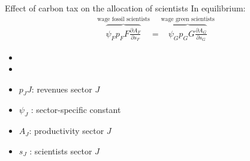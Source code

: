 \documentclass[11pt,aspectratio=169]{beamer}
\begin{document}

\begin{frame}{Effect of carbon tax on the allocation of scientists}
	\vspace{2mm}
	In equilibrium: \large
	\begin{align*}
		\overbrace{{\psi_F} p_F{F}\frac{\partial A_{F}}{\partial s_{F}}}^{\text{wage fossil scientists}}=\overbrace{{\psi_G} p_G{G}\frac{\partial A_{G}}{\partial s_{G}}}^{\text{wage green scientists}}
	\end{align*}
	\normalsize
	\begin{itemize}
		\item[] %
		\item[] %
	\end{itemize}
	\small
	\vspace{4mm}
	\hspace{-2mm}
	\begin{minipage}[t!]{0.4\textwidth}
		\vspace{0mm}
		\begin{itemize}
			\item[] $p_JJ$: revenues sector $J$
			\vspace{-2mm}
			\item[] $\psi_J$ : sector-specific constant
		\end{itemize}
	\end{minipage}
	\vspace{-5mm}
	\begin{minipage}[t!]{0.5\textwidth}
		\vspace{0mm}
		\begin{itemize}	
			\item[] $A_J$: productivity sector $J$
			\vspace{-2mm}			
			\item[] $s_J$ : scientists sector $J$
		\end{itemize}
	\end{minipage}
\end{frame}
\end{document}
